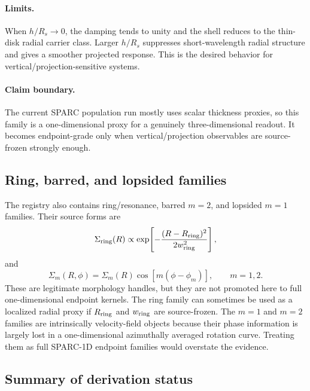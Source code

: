 \documentclass[11pt]{article}
\begin{document}
\paragraph{Limits.}
When \(h/R_s\to 0\), the damping tends to unity and the shell reduces to the
thin-disk radial carrier class.  Larger \(h/R_s\) suppresses short-wavelength
radial structure and gives a smoother projected response.  This is the desired
behavior for vertical/projection-sensitive systems.

\paragraph{Claim boundary.}
The current SPARC population run mostly uses scalar thickness proxies, so this
family is a one-dimensional proxy for a genuinely three-dimensional readout.
It becomes endpoint-grade only when vertical/projection observables are
source-frozen strongly enough.

\subsection{Ring, barred, and lopsided families}

The registry also contains ring/resonance, barred \(m=2\), and lopsided \(m=1\)
families.  Their source forms are
\[
\Sigma_{\rm ring}(R)\propto
\exp\!\left[-\frac{(R-R_{\rm ring})^2}{2w_{\rm ring}^2}\right],
\]
and
\[
\Sigma_m(R,\phi)=\Sigma_m(R)\cos[m(\phi-\phi_m)],
\qquad m=1,2 .
\]
These are legitimate morphology handles, but they are not promoted here to
full one-dimensional endpoint kernels.  The ring family can sometimes be used
as a localized radial proxy if \(R_{\rm ring}\) and \(w_{\rm ring}\) are
source-frozen.  The \(m=1\) and \(m=2\) families are intrinsically
velocity-field objects because their phase information is largely lost in a
one-dimensional azimuthally averaged rotation curve.  Treating them as full
SPARC-1D endpoint families would overstate the evidence.

\subsection{Summary of derivation status}
\end{document}
